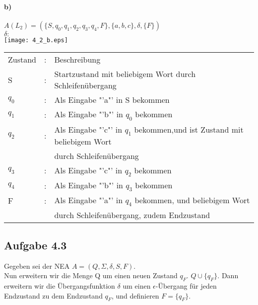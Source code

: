\documentclass[11pt,a4paper]{article}
\begin{document}
\paragraph*{b)}
$A(L_2)=(\{S,q_0,q_1,q_2,q_3,q_4,F\},\{a,b,c\},\delta,\{F\})$\\
$\delta:$\\
\texttt{[image: 4\_2\_b.eps]}\\
\begin{tabular}{lll}
Zustand&:&Beschreibung\\
S&:&Startzustand mit beliebigem Wort durch Schleifenübergang\\
$q_0$&:&Als Eingabe "'a"' in S bekommen\\
$q_1$&:&Als Eingabe "'b"' in $q_0$ bekommen\\
$q_2$&:&Als Eingabe "'c"' in $q_1$ bekommen,und ist Zustand mit beliebigem Wort\\
&&durch Schleifenübergang\\
$q_3$&:&Als Eingabe "'c"' in $q_2$ bekommen\\
$q_4$&:&Als Eingabe "'b"' in $q_3$ bekommen\\
F&:&Als Eingabe "'a"' in $q_4$ bekommen, und beliebigem Wort\\
&&durch Schleifenübergang, zudem Endzustand\\
\end{tabular}

\subsection*{Aufgabe 4.3}
Gegeben sei der NEA $A=(Q,\Sigma ,\delta, S, F)$.\\
Nun erweitern wir die Menge Q um einen neuen Zustand $q_F$. $Q \cup \{q_F\}$. Dann erweitern wir die Übergangsfunktion $\delta$ um einen $\epsilon$-Übergang für jeden Endzustand zu dem Endzustand $q_F$, und definieren $F=\{q_F\}$.
\end{document}
